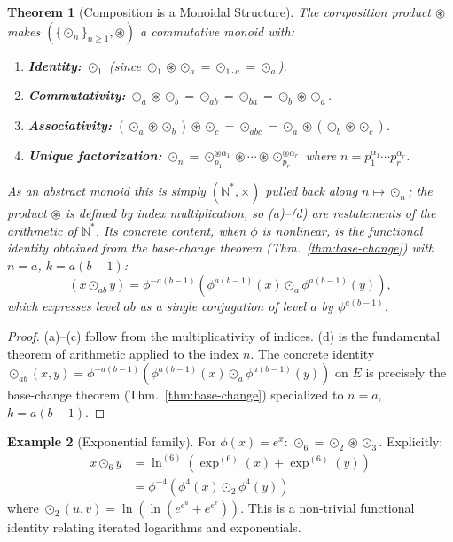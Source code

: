\documentclass[11pt,twocolumn]{article}
\theoremstyle{plain}
\newtheorem{theorem}{Theorem}
\theoremstyle{definition}
\newtheorem{example}[theorem]{Example}
\theoremstyle{remark}
\newcommand{\N}{\mathbb{N}}
\begin{document}
\begin{theorem}[Composition is a Monoidal Structure]\label{thm:composition}
The composition product $\circledast$ makes $(\{\odot_n\}_{n \geq 1}, \circledast)$ a commutative monoid with:
\begin{enumerate}[label=(\alph*)]
    \item \textbf{Identity:} $\odot_1$ (since $\odot_1 \circledast \odot_a = \odot_{1 \cdot a} = \odot_a$).
    \item \textbf{Commutativity:} $\odot_a \circledast \odot_b = \odot_{ab} = \odot_{ba} = \odot_b \circledast \odot_a$.
    \item \textbf{Associativity:} $(\odot_a \circledast \odot_b) \circledast \odot_c = \odot_{abc} = \odot_a \circledast (\odot_b \circledast \odot_c)$.
    \item \textbf{Unique factorization:} $\odot_n = \odot_{p_1}^{\circledast \alpha_1} \circledast \cdots \circledast \odot_{p_r}^{\circledast \alpha_r}$ where $n = p_1^{\alpha_1} \cdots p_r^{\alpha_r}$.
\end{enumerate}

As an abstract monoid this is simply $(\N^*,\times)$ pulled back along $n\mapsto\odot_n$; the product $\circledast$ is \emph{defined} by index multiplication, so (a)--(d) are restatements of the arithmetic of $\N^*$. Its concrete content, when $\phi$ is nonlinear, is the functional identity obtained from the base-change theorem (Thm.~\ref{thm:base-change}) with $n=a$, $k=a(b-1)$:
\begin{equation}
(x \odot_{ab} y) = \phi^{-a(b-1)}\!\left(\phi^{a(b-1)}(x) \odot_a \phi^{a(b-1)}(y)\right),
\end{equation}
which expresses level $ab$ as a single conjugation of level $a$ by $\phi^{a(b-1)}$.
\end{theorem}

\begin{proof}
(a)--(c) follow from the multiplicativity of indices.
(d) is the fundamental theorem of arithmetic applied to the index $n$.
The concrete identity $\odot_{ab}(x,y) = \phi^{-a(b-1)}(\phi^{a(b-1)}(x) \odot_a \phi^{a(b-1)}(y))$ on $E$ is precisely the base-change theorem (Thm.~\ref{thm:base-change}) specialized to $n=a$, $k=a(b-1)$.
\end{proof}

\begin{example}[Exponential family]
For $\phi(x) = e^x$: $\odot_6 = \odot_2 \circledast \odot_3$. Explicitly:
\begin{align*}
x \odot_6 y &= \ln^{(6)}(\exp^{(6)}(x) + \exp^{(6)}(y)) \\
&= \phi^{-4}(\phi^4(x) \odot_2 \phi^4(y))
\end{align*}
where $\odot_2(u,v) = \ln(\ln(e^{e^u} + e^{e^v}))$. This is a non-trivial functional identity relating iterated logarithms and exponentials.
\end{example}
\end{document}
